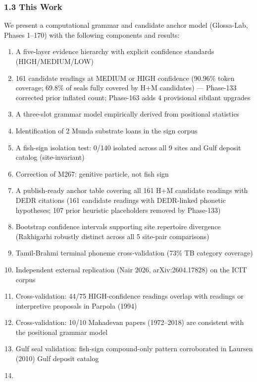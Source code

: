 \documentclass[
]{article}
\providecommand{\tightlist}{%
  \setlength{\itemsep}{0pt}\setlength{\parskip}{0pt}}
\begin{document}
\subsubsection{1.3 This Work}\label{this-work}

We present a computational grammar and candidate anchor model (Glossa-Lab, Phases 1--170) with the following components and results:

\begin{enumerate}
\def\labelenumi{\arabic{enumi}.}
\tightlist
\item
  A five-layer evidence hierarchy with explicit confidence standards
  (HIGH/MEDIUM/LOW)
\item
  161 candidate readings at MEDIUM or HIGH confidence (90.96\% token coverage; 69.8\% of seals fully covered by H+M candidates) --- Phase-133 corrected prior inflated count; Phase-163 adds 4 provisional sibilant upgrades
\item
  A three-slot grammar model empirically derived from positional
  statistics
\item
  Identification of 2 Munda substrate loans in the sign corpus
\item
  A fish-sign isolation test: 0/140 isolated across all 9 sites and Gulf deposit catalog (site-invariant)
\item
  Correction of M267: genitive particle, not fish sign
\item
  A publish-ready anchor table covering all 161 H+M candidate readings with DEDR
  citations (161 candidate readings with DEDR-linked phonetic hypotheses; 107 prior heuristic placeholders removed by Phase-133)
\item
  Bootstrap confidence intervals supporting site repertoire divergence (Rakhigarhi robustly distinct across all 5 site-pair comparisons)
\item
  Tamil-Brahmi terminal phoneme cross-validation (73\% TB category
  coverage)
\item
  Independent external replication (Nair 2026, arXiv:2604.17828) on the
  ICIT corpus
\item
  Cross-validation: 44/75 HIGH-confidence readings overlap with readings or interpretive proposals in Parpola (1994)
\item
  Cross-validation: 10/10 Mahadevan papers (1972--2018) are consistent with the positional grammar model
\item
  Gulf seal validation: fish-sign compound-only pattern corroborated in Laursen (2010) Gulf deposit catalog
\item

\end{enumerate}
\end{document}
